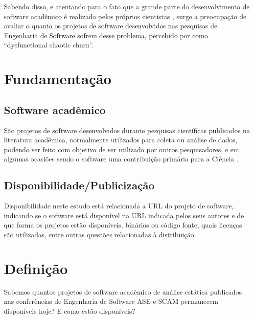 Sabendo disso, e atentando para o fato que a grande parte do desenvolvimento de
software acadêmico é realizado pelos próprios cientistas \cite{hettrick2014uk,
momcheva2015software}, surge a preocupação de avaliar o quanto os projetos de
software desenvolvidos nas pesquisas de Engenharia de Software sofrem desse
problema, percebido por  como
``dysfunctional chaotic churn''.


\section{Fundamentação} \label{estudo1:fundamentacao} %

\subsection{Software acadêmico}

São projetos de software desenvolvidos durante pesquisas científicas publicados
na literatura acadêmica, normalmente utilizados para coleta ou análise de
dados, podendo ser feito com objetivo de ser utilizado por outros
pesquisadores, e em algumas ocasiões sendo o software uma contribuição primária
para a Ciência \cite{howison2011scientific}.

\subsection{Disponibilidade/Publicização}


Disponibilidade neste estudo está relacionada a URL do projeto de software,
indicando se o software está disponível na URL indicada pelos seus autores e de
que forma os projetos estão disponíveis, binários ou código fonte, quais
licenças são utilizadas, entre outras questões relacionadas à distribuição.


\section{Definição} \label{estudo1:definicao} %

Sabemos quantos projetos de software acadêmico de análise estática publicados
nas conferências de Engenharia de Software ASE e SCAM permanecem disponíveis
hoje? E como estão disponíveis?

